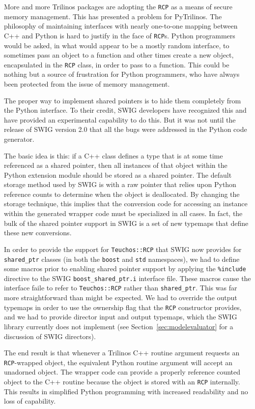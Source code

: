 \documentclass[11pt]{article}
\begin{document}
More and more Trilinos packages are adopting the {\tt RCP} as a means of secure memory management.  This has presented a problem for PyTrilinos.  The philosophy of maintaining interfaces with nearly one-to-one mapping between C++ and Python is hard to justify in the face of {\tt RCP}s.  Python programmers would be asked, in what would appear to be a mostly random interface, to sometimes pass an object to a function and other times create a new object, encapsulated in the {\tt RCP} class, in order to pass to a function.  This could be nothing but a source of frustration for Python programmers, who have always been protected from the issue of memory management.

The proper way to implement shared pointers is to hide them completely from the Python interface.  To their credit, SWIG developers have recognized this and have provided an experimental capability to do this.  But it was not until the release of SWIG version 2.0 that all the bugs were addressed in the Python code generator.

The basic idea is this: if a C++ class defines a type that is at some time referenced as a shared pointer, then all instances of that object within the Python extension module should be stored as a shared pointer.  The default storage method used by SWIG is with a raw pointer that relies upon Python reference counts to determine when the object is deallocated.  By changing the storage technique, this implies that the conversion code for accessing an instance within the generated wrapper code must be specialized in all cases.  In fact, the bulk of the shared pointer support in SWIG is a set of new typemaps that define these new conversions.

In order to provide the support for {\tt Teuchos::RCP} that SWIG now provides for {\tt shared\_ptr} classes (in both the {\tt boost} and {\tt std} namespaces), we had to define some macros prior to enabling shared pointer support by applying the {\tt \%include} directive to the SWIG {\tt boost\_shared\_ptr.i} interface file. These macros cause the interface faile to refer to {\tt Teuchos::RCP} rather than {\tt shared\_ptr}.  This was far more straightforward than might be expected.  We had to override the output typemaps in order to use the ownership flag that the {\tt RCP} constructor provides, and we had to provide director input and output typemaps, which the SWIG library currently does not implement (see Section~\ref{sec:modelevaluator} for a discussion of SWIG directors).

The end result is that whenever a Trilinos C++ routine argument requests an {\tt RCP}-wrapped object, the equivalent Python routine argument will accept an unadorned object.  The wrapper code can provide a properly reference counted object to the C++ routine because the object is stored with an {\tt RCP} internally.  This results in simplified Python programming with increased readability and no loss of capability.
\end{document}
